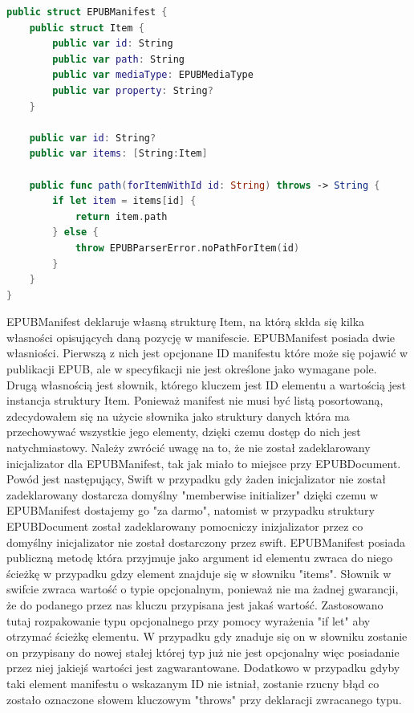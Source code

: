 \begin{lstlisting}[caption={Struktura EPUBManifest.}, language=swift]
public struct EPUBManifest {
    public struct Item {
        public var id: String
        public var path: String
        public var mediaType: EPUBMediaType
        public var property: String?
    }

    public var id: String?
    public var items: [String:Item]

    public func path(forItemWithId id: String) throws -> String {
        if let item = items[id] {
            return item.path
        } else {
            throw EPUBParserError.noPathForItem(id)
        }
    }
}
\end{lstlisting}

EPUBManifest deklaruje własną strukturę Item, na którą skłda się kilka własności opisujących daną pozycję w manifescie. EPUBManifest posiada dwie własniości. Pierwszą z nich jest opcjonane ID manifestu które może się pojawić w publikacji EPUB, ale w specyfikacji nie jest określone jako wymagane pole. Drugą własnością jest słownik, którego kluczem jest ID elementu a wartością jest instancja struktury Item. Ponieważ manifest nie musi być listą posortowaną, zdecydowałem się na użycie słownika jako struktury danych która ma przechowywać wszystkie jego elementy, dzięki czemu dostęp do nich jest natychmiastowy. Należy zwrócić uwagę na to, że nie został zadeklarowany inicjalizator dla EPUBManifest, tak jak miało to miejsce przy EPUBDocument. Powód jest następujący, Swift w przypadku gdy żaden inicjalizator nie został zadeklarowany dostarcza domyślny "memberwise initializer" dzięki czemu w EPUBManifest dostajemy go "za darmo", natomist w przypadku struktury EPUBDocument został zadeklarowany pomocniczy inizjalizator przez co domyślny inicjalizator nie został dostarczony przez swift. EPUBManifest posiada publiczną metodę która przyjmuje jako argument id elementu zwraca do niego ścieżkę w przypadku gdzy element znajduje się w słowniku "items". Słownik w swifcie zwraca wartość o typie opcjonalnym, ponieważ nie ma żadnej gwarancji, że do podanego przez nas kluczu przypisana jest jakaś wartość. Zastosowano tutaj rozpakowanie typu opcjonalnego przy pomocy wyrażenia "if let" aby otrzymać ścieżkę elementu. W przypadku gdy znaduje się on w słowniku zostanie on przypisany do nowej stałej której typ już nie jest opcjonalny więc posiadanie przez niej jakiejś wartości jest zagwarantowane. Dodatkowo w przypadku gdyby taki element manifestu o wskazanym ID nie istniał, zostanie rzucny błąd co zostało oznaczone słowem kluczowym "throws" przy deklaracji zwracanego typu.

